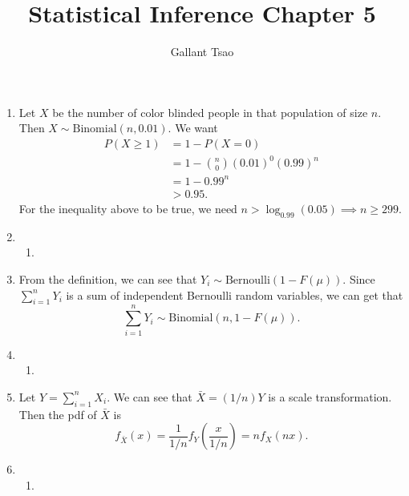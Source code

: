 \documentclass{article}
\title{Statistical Inference Chapter 5}
\author{Gallant Tsao}
\begin{document}
\maketitle

\begin{enumerate}
    \item Let $X$ be the number of color blinded people in that population of size $n$. Then 
    $X \sim \text{Binomial}(n, 0.01)$. We want 
    \begin{align*}
        P(X \geq 1) 
        &= 1 - P(X = 0) \\
        &= 1 - \binom{n}{0}(0.01)^{0}(0.99)^{n} \\
        &= 1 - 0.99^{n} \\
        &> 0.95.
    \end{align*}
    For the inequality above to be true, we need $n > \log_{0.99}(0.05) \implies n \geq 299$.

    \item \begin{enumerate}
        \item 
    \end{enumerate}

    \item From the definition, we can see that $Y_i \sim \text{Bernoulli}(1 - F(\mu))$. 
    Since 
    $\sum_{i = 1}^{n} Y_{i}$ is a sum of independent Bernoulli random variables, we can get 
    that \[ \sum_{i = 1}^{n} Y_{i} \sim \text{Binomial}(n, 1 - F(\mu)). \]

    \item \begin{enumerate}
        \item 
    \end{enumerate}

    \item Let $Y = \sum_{i = 1}^{n} X_i$. We can see that 
    $\bar{X} = (1/n)Y$ is a scale transformation. Then the pdf of $\bar{X}$ is 
    \[ f_{\bar{X}}(x) = \frac{1}{1/n} f_{Y}(\frac{x}{1/n}) = nf_{X}(nx). \]

    \item \begin{enumerate}
        \item 
    \end{enumerate}

\end{enumerate}
\end{document}
